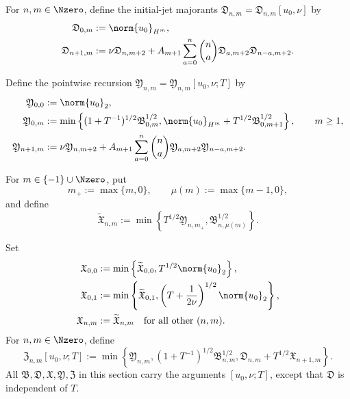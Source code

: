 \begin{definition}
For \(n,m\in\Nzero\), define the initial-jet majorants
\(\mathfrak D_{n,m}=\mathfrak D_{n,m}[u_0,\nu]\) by
\begin{align}
 \mathfrak D_{0,m}&:=\norm{u_0}_{H^m},
 \label{eq:qc-D0}\\
 \mathfrak D_{n+1,m}
 &:=\nu\mathfrak D_{n,m+2}
 +A_{m+1}\sum_{a=0}^{n}\binom na
   \mathfrak D_{a,m+2}\mathfrak D_{n-a,m+2}.
 \label{eq:qc-Drec}
\end{align}
\begin{samepage}
Define the pointwise recursion
\(\mathfrak Y_{n,m}=\mathfrak Y_{n,m}[u_0,\nu;T]\) by
\begin{align}
 \mathfrak Y_{0,0}&:=\norm{u_0}_2,
 \label{eq:qc-Y00}\\
 \mathfrak Y_{0,m}
 &:=\min\left\{
 (1+T^{-1})^{1/2}\mathfrak B_{0,m}^{1/2},
 \norm{u_0}_{H^m}+T^{1/2}\mathfrak B_{0,m+1}^{1/2}
 \right\},
 \qquad m\ge1,
 \label{eq:qc-Y0}\\
 \mathfrak Y_{n+1,m}
 &:=\nu\mathfrak Y_{n,m+2}
 +A_{m+1}\sum_{a=0}^{n}\binom na
 \mathfrak Y_{a,m+2}\mathfrak Y_{n-a,m+2}.
 \label{eq:qc-Yrec}
\end{align}
\end{samepage}
\begin{samepage}
For \(m\in\{-1\}\cup\Nzero\), put
\[
 m_+:=\max\{m,0\},
 \qquad
 \mu(m):=\max\{m-1,0\},
\]
and define
\begin{equation}
 \widetilde{\mathfrak X}_{n,m}
 :=\min\left\{
 T^{1/2}\mathfrak Y_{n,m_+},
 \mathfrak B_{n,\mu(m)}^{1/2}
 \right\}.
 \label{eq:qc-Xraw}
\end{equation}
\end{samepage}
Set
\begin{align}
 \mathfrak X_{0,0}
 &:=\min\left\{\widetilde{\mathfrak X}_{0,0},
 T^{1/2}\norm{u_0}_2\right\},
 \label{eq:qc-X00}\\
 \mathfrak X_{0,1}
 &:=\min\left\{\widetilde{\mathfrak X}_{0,1},
 \left(T+\frac1{2\nu}\right)^{1/2}\norm{u_0}_2\right\},
 \label{eq:qc-X01}\\
 \mathfrak X_{n,m}&:=\widetilde{\mathfrak X}_{n,m}
 \quad\text{for all other }(n,m).
 \label{eq:qc-Xotherwise}
\end{align}
For \(n,m\in\Nzero\), define
\begin{equation}
 \mathfrak Z_{n,m}[u_0,\nu;T]
 :=\min\left\{
 \mathfrak Y_{n,m},
 (1+T^{-1})^{1/2}\mathfrak B_{n,m}^{1/2},
 \mathfrak D_{n,m}+T^{1/2}\mathfrak X_{n+1,m}
 \right\}.
 \label{eq:qc-Z}
\end{equation}
All \(\mathfrak B,\mathfrak D,\mathfrak X,\mathfrak Y,\mathfrak Z\) in
this section carry the arguments \([u_0,\nu;T]\), except that
\(\mathfrak D\) is independent of \(T\).
\end{definition}

